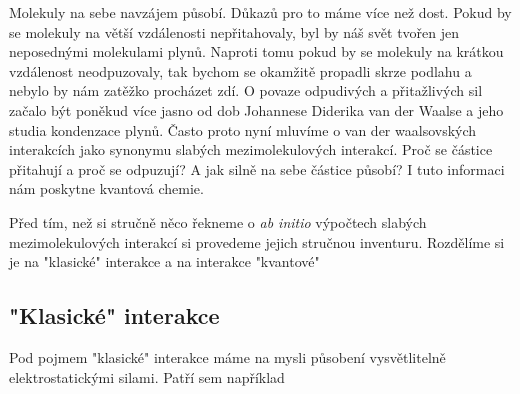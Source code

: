 Molekuly na sebe navzájem působí. Důkazů pro to máme více než dost. Pokud by se molekuly na větší vzdálenosti nepřitahovaly, byl by náš svět tvořen jen neposednými molekulami plynů. Naproti tomu pokud by se molekuly na krátkou vzdálenost neodpuzovaly, tak bychom se okamžitě propadli skrze podlahu a nebylo by nám zatěžko procházet zdí. O povaze odpudivých a přitažlivých sil začalo být poněkud více jasno od dob Johannese Diderika van der Waalse a jeho studia kondenzace plynů. Často proto nyní mluvíme o van der waalsovských interakcích jako synonymu slabých mezimolekulových interakcí. Proč se částice přitahují a proč se odpuzují? A jak silně na sebe částice působí? I tuto informaci nám poskytne kvantová chemie.

Před tím, než si stručně něco řekneme o \textit{ab initio} výpočtech slabých mezimolekulových interakcí si provedeme jejich stručnou inventuru. Rozdělíme si je na "klasické" interakce a na interakce "kvantové"     


\subsection{"Klasické" interakce}
Pod pojmem "klasické" interakce máme na mysli působení vysvětlitelně elektrostatickými silami. Patří sem například

